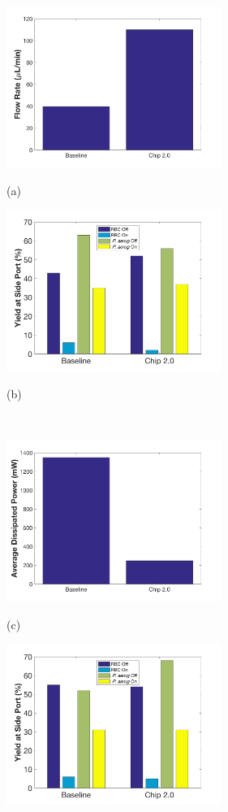 \begin{figure}[H]
  \begin{minipage}[t]{0.49\linewidth}\centering
    \includegraphics[width=7cm]{flowBac}
    \medskip
    \centerline{(a)}
  \end{minipage}\hfill
  \begin{minipage}[t]{0.49\linewidth}\centering
    \includegraphics[width=7cm]{maxFlow}
    \medskip
    \centerline{(b)}
  \end{minipage}\\
  \begin{minipage}[t]{0.49\linewidth}\centering
    \includegraphics[width=7cm]{powerBac}
    \medskip
    \centerline{(c)}
  \end{minipage}\hfill
  \begin{minipage}[t]{0.49\linewidth}\centering
    \includegraphics[width=7cm]{minPower}

\end{minipage}
\end{figure}
